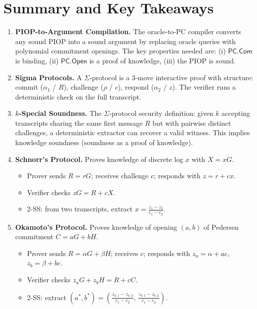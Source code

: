 \documentclass[11pt]{article}
\begin{document}
\section{Summary and Key Takeaways}

\begin{tcolorbox}[colback=blue!5!white, colframe=blue!60!black, title={Lecture Summary}]
\begin{enumerate}
  \item \textbf{PIOP-to-Argument Compilation.} The oracle-to-PC compiler converts any sound PIOP into a sound argument by replacing oracle queries with polynomial commitment openings. The key properties needed are: (i) $\mathsf{PC.Com}$ is binding, (ii) $\mathsf{PC.Open}$ is a proof of knowledge, (iii) the PIOP is sound.

  \item \textbf{Sigma Protocols.} A $\Sigma$-protocol is a 3-move interactive proof with structure: commit ($\alpha_1$ / $R$), challenge ($\rho$ / $c$), respond ($\alpha_2$ / $z$). The verifier runs a deterministic check on the full transcript.

  \item \textbf{$k$-Special Soundness.} The $\Sigma$-protocol security definition: given $k$ accepting transcripts sharing the same first message $R$ but with pairwise distinct challenges, a deterministic extractor can recover a valid witness. This implies knowledge soundness (soundness as a proof of knowledge).

  \item \textbf{Schnorr's Protocol.} Proves knowledge of discrete log $x$ with $X = xG$.
    \begin{itemize}
      \item Prover sends $R = rG$; receives challenge $c$; responds with $z = r + cx$.
      \item Verifier checks $zG = R + cX$.
      \item 2-SS: from two transcripts, extract $x = \frac{z_1 - z_2}{c_1 - c_2}$.
    \end{itemize}

  \item \textbf{Okamoto's Protocol.} Proves knowledge of opening $(a,b)$ of Pedersen commitment $C = aG + bH$.
    \begin{itemize}
      \item Prover sends $R = \alpha G + \beta H$; receives $c$; responds with $z_a = \alpha + ac$, $z_b = \beta + bc$.
      \item Verifier checks $z_a G + z_b H = R + cC$.
      \item 2-SS: extract $(a^*, b^*) = \left(\frac{z_{a,1}-z_{a,2}}{c_1-c_2},\, \frac{z_{b,1}-z_{b,2}}{c_1-c_2}\right)$.
    \end{itemize}


\end{enumerate}
\end{tcolorbox}
\end{document}
